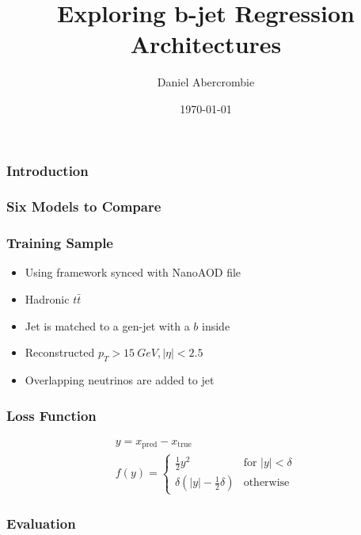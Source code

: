 \documentclass{beamer}
\author[D. Abercrombie]{
  Daniel Abercrombie
}
\title{\bf \sffamily Exploring b-jet Regression Architectures}
\date{\today}
\begin{document}
\begin{frame}
  \titlepage
\end{frame}

\begin{frame}
  \frametitle{Introduction}
\end{frame}

\begin{frame}
  \frametitle{Six Models to Compare}
\end{frame}

\begin{frame}
  \frametitle{Training Sample}

  \begin{itemize}
  \item Using framework synced with NanoAOD file
  \item Hadronic $t\bar{t}$
  \item Jet is matched to a gen-jet with a $b$ inside
  \item Reconstructed $p_T > \SI{15}{GeV}, |\eta| < 2.5$
  \item Overlapping neutrinos are added to jet
  \end{itemize}

\end{frame}

\begin{frame}
  \frametitle{Loss Function}

  \begin{gather*}
    y = x_\mathrm{pred} - x_\mathrm{true} \\
    f(y) = \begin{cases}
      \frac12 y^2 & \mbox{for } |y| < \delta \\
      \delta(|y| - \frac12 \delta) & \mbox{otherwise}
      \end{cases}
  \end{gather*}


\end{frame}

\begin{frame}
  \frametitle{Evaluation}


\end{frame}
\end{document}
